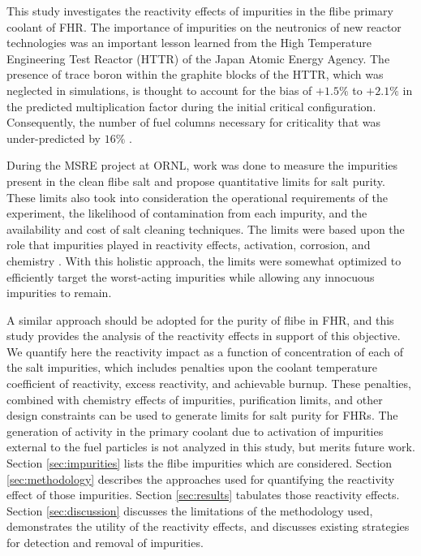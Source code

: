 \documentclass[11pt]{article}
\begin{document}
This study investigates the reactivity effects of impurities in the flibe primary coolant of FHR.
The importance of impurities on the neutronics of new reactor technologies was an important lesson learned from the High Temperature Engineering Test Reactor (HTTR) of the Japan Atomic Energy Agency.
The presence of trace boron within the graphite blocks of the HTTR, which was neglected in simulations, is thought to account for the bias of $+1.5\%$ to $+2.1\%$ in the predicted multiplication factor during the initial critical configuration.
Consequently, the number of fuel columns necessary for criticality that was under-predicted by $16\%$ \cite{bess2010esu}.

During the MSRE project at ORNL, work was done to measure the impurities present in the clean flibe salt and propose quantitative limits for salt purity.
These limits also took into consideration the operational requirements of the experiment, the likelihood of contamination from each impurity, and the availability and cost of salt cleaning techniques.
The limits were based upon the role that impurities played in reactivity effects, activation, corrosion, and chemistry \cite{shaffer1971phs}.
With this holistic approach, the limits were somewhat optimized to efficiently target the worst-acting impurities while allowing any innocuous impurities to remain.

A similar approach should be adopted for the purity of flibe in FHR, and this study provides the analysis of the reactivity effects in support of this objective.
We quantify here the reactivity impact as a function of concentration of each of the salt impurities, which includes penalties upon the coolant temperature coefficient of reactivity, excess reactivity, and achievable burnup.
These penalties, combined with chemistry effects of impurities, purification limits, and other design constraints can be used to generate limits for salt purity for FHRs.
The generation of activity in the primary coolant due to activation of impurities external to the fuel particles is not analyzed in this study, but merits future work.
Section \ref{sec:impurities} lists the flibe impurities which are considered.
Section \ref{sec:methodology} describes the approaches used for quantifying the reactivity effect of those impurities.
Section \ref{sec:results} tabulates those reactivity effects.
Section \ref{sec:discussion} discusses the limitations of the methodology used, demonstrates the utility of the reactivity effects, and discusses existing strategies for detection and removal of impurities.
\end{document}
